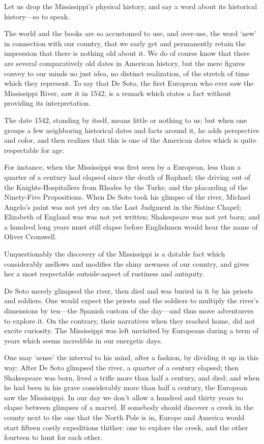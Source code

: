 \documentclass[../interior-demo.tex]{subfiles}
\begin{document}
Let us drop the Mississippi's physical history, and say a word about its
historical history---so to speak.

The world and the books are so accustomed to use, and over-use, the word
`new' in connection with our country, that we early get and permanently
retain the impression that there is nothing old about it. We do of
course know that there are several comparatively old dates in American
history, but the mere figures convey to our minds no just idea, no
distinct realization, of the stretch of time which they represent.
To say that De Soto, the first European who ever saw the Mississippi
River, saw it in 1542, is a remark which states a fact without
providing its interpretation.

The date 1542, standing by itself, means little or nothing to us; but
when one groups a few neighboring historical dates and facts around it,
he adds perspective and color, and then realizes that this is one of the
American dates which is quite respectable for age.

For instance, when the Mississippi was first seen by a European, less
than a quarter of a century had elapsed since the death of Raphael;
the driving out of the Knights-Hospitallers from Rhodes by
the Turks; and the placarding of the Ninety-Five Propositions.
When De Soto took his glimpse of the river,
Michael Angelo's paint was not yet dry on the Last
Judgment in the Sistine Chapel; Elizabeth of England was
 was not yet written;
Shakespeare was not yet born;
and a hundred long years must
still elapse before Englishmen would hear the name of Oliver Cromwell.

Unquestionably the discovery of the Mississippi is a datable fact which
considerably mellows and modifies the shiny newness of our country, and
gives her a most respectable outside-aspect of rustiness and antiquity.

De Soto merely glimpsed the river, then died and was buried in it by his
priests and soldiers. One would expect the priests and the soldiers
to multiply the river's dimensions by ten---the Spanish custom of the
day---and thus move adventurers to
explore it. On the contrary, their narratives when they reached home,
did not excite  curiosity. The Mississippi was left
unvisited by Europeans during a term of years which seems incredible in our
energetic days.

One may `sense' the interval to his mind, after a fashion, by dividing it
up in this way: After De Soto glimpsed the river,
a quarter of a century elapsed; then Shakespeare was born,
lived a trifle more than half a century, and died; and when he had been in
his grave considerably more than half a century, the  European
saw the Mississippi. In our day we don't allow a hundred and thirty years to
elapse between glimpses of a marvel. If somebody should discover a creek
in the county next to the one that the North Pole is in, Europe and
America would start fifteen costly expeditions thither: one to explore
the creek, and the other fourteen to hunt for each other.
\end{document}
